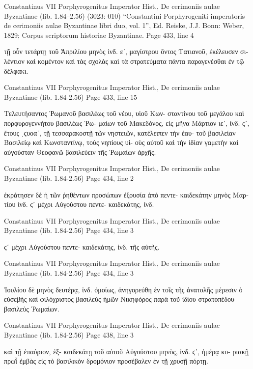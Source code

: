 \documentclass[12pt,letterpaper,twoside,final]{memoir}
\begin{document}
\begin{greek}
Constantinus VII Porphyrogenitus Imperator Hist., De cerimoniis aulae Byzantinae (lib. 1.84–2.56) (3023: 010)
“Constantini Porphyrogeniti imperatoris de cerimoniis aulae Byzantinae libri duo, vol. 1”, Ed. Reiske, J.J.
Bonn: Weber, 1829; Corpus scriptorum historiae Byzantinae.
Page 433, line 4

                                                    τῇ οὖν τετάρτῃ 
τοῦ Ἀπριλίου μηνὸς ἰνδ. εʹ, μαγίστρου ὄντος Τατιανοῦ, 
ἐκέλευσεν σιλέντιον καὶ κομέντον καὶ τὰς σχολὰς καὶ τὰ 
στρατεύματα πάντα παραγενέσθαι ἐν τῷ δέλφακι. 



Constantinus VII Porphyrogenitus Imperator Hist., De cerimoniis aulae Byzantinae (lib. 1.84-2.56) 
Page 433, line 15

Τελευτήσαντος Ῥωμανοῦ βασιλέως τοῦ νέου, υἱοῦ Κων-
σταντίνου τοῦ μεγάλου καὶ πορφυρογεννήτου βασιλέως Ῥω-
μαίων τοῦ Μακεδόνος, εἰς μῆνα Μάρτιον ιεʹ, ἰνδ. ϛʹ, ἔτους 
͵ϛυοαʹ, τῇ τεσσαρακοστῇ τῶν νηστειῶν, κατέλειπεν τὴν ἑαυ-
τοῦ βασιλείαν Βασιλείῳ καὶ Κωνσταντίνῳ, τοὺς νηπίους υἱ-
οὺς αὐτοῦ καὶ τὴν ἰδίαν γαμετὴν καὶ αὐγούσταν Θεοφανῶ 
βασιλεύειν τῆς Ῥωμαίων ἀρχῆς. 



Constantinus VII Porphyrogenitus Imperator Hist., De cerimoniis aulae Byzantinae (lib. 1.84-2.56) 
Page 434, line 2

ἐκράτησεν δὲ ἡ τῶν ῥηθέντων προσώπων ἐξουσία ἀπὸ πεντε-
καιδεκάτην μηνὸς Μαρτίου ἰνδ. ϛʹ μέχρι Αὐγούστου πεντε-
καιδεκάτης, ἰνδ. 



Constantinus VII Porphyrogenitus Imperator Hist., De cerimoniis aulae Byzantinae (lib. 1.84-2.56) 
Page 434, line 3

                                   ϛʹ μέχρι Αὐγούστου πεντε-
καιδεκάτης, ἰνδ. τῆς αὐτῆς. 



Constantinus VII Porphyrogenitus Imperator Hist., De cerimoniis aulae Byzantinae (lib. 1.84-2.56) 
Page 434, line 3

                                 Ἰουλίου δὲ μηνὸς δευτέρᾳ, ἰνδ. 
ὁμοίως, ἀνηγορεύθη ἐν τοῖς τῆς ἀνατολῆς μέρεσιν ὁ εὐσεβὴς 
καὶ φιλόχριστος βασιλεὺς ἡμῶν Νικηφόρος παρὰ τοῦ ἰδίου 
στρατοπέδου βασιλεὺς Ῥωμαίων. 



Constantinus VII Porphyrogenitus Imperator Hist., De cerimoniis aulae Byzantinae (lib. 1.84-2.56) 
Page 438, line 3

                                           καὶ τῇ ἐπαύριον, ἑξ-
καιδεκάτῃ τοῦ αὐτοῦ Αὐγούστου μηνὸς, ἰνδ. ϛʹ, ἡμέρᾳ κυ-
ριακῇ πρωῒ ἐμβὰς εἰς τὸ βασιλικὸν δρομόνιον προσέβαλεν ἐν 
τῇ χρυσῇ πόρτῃ. 




\end{greek}
\end{document}
